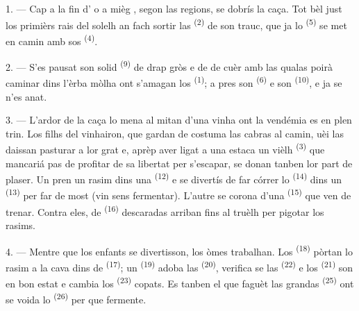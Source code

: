 \VUsaut{6.0mm}
\VUsaut{3.6mm}

\VUsaut{1.4mm}
\VUsaut{4.0mm}

1. --- Cap a la fin d' o a mièg , segon las
regions, se dobrís la caça. Tot bèl just los primièrs rais del solelh an fach
sortir las  \textsuperscript{(2)} de son trauc, que ja lo
 \textsuperscript{(5)} se met en camin amb sos 
\textsuperscript{(4)}.

2. --- S'es pausat son solid  \textsuperscript{(9)} de drap
gròs e de  de cuèr amb las qualas poirà caminar dins l'èrba mòlha
ont s'amagan los  \textsuperscript{(1)}; a pres son
 \textsuperscript{(6)} e son 
\textsuperscript{(10)}, e ja se n'es anat.

3. --- L'ardor de la caça lo mena al mitan d'una vinha ont la vendémia es en plen
trin. Los filhs del vinhairon, que gardan de costuma las cabras al camin, uèi las
daissan pasturar a lor grat e, aprèp aver ligat a una estaca un vièlh
 \textsuperscript{(3)} que mancariá pas de profitar de sa libertat per
s'escapar, se donan tanben lor part de plaser. Un pren un rasim dins una
 \textsuperscript{(12)} e se divertís de far córrer lo 
\textsuperscript{(14)} dins un  \textsuperscript{(13)} per far de
most (vin sens fermentar). L'autre se corona d'una 
\textsuperscript{(15)} que ven de trenar. Contra eles, de 
\textsuperscript{(16)} descaradas arriban fins al truèlh per pigotar los rasims.

4. --- Mentre que los enfants se divertisson, los òmes trabalhan. Los
 \textsuperscript{(18)} pòrtan lo rasim a la cava dins de
 \textsuperscript{(17)}; un 
\textsuperscript{(19)} adoba las  \textsuperscript{(20)},
verifica se las  \textsuperscript{(22)} e los 
\textsuperscript{(21)} son en bon estat e cambia los 
\textsuperscript{(23)} copats. Es tanben el que faguèt las grandas
 \textsuperscript{(25)} ont se voida lo 
\textsuperscript{(26)} per que fermente.

